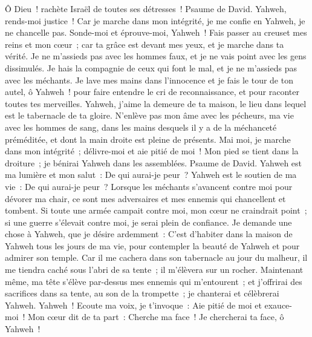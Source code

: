 \begin{multicols}{2}
 Ô Dieu~! rachète Israël de toutes ses détresses~!
\VerseOne{}Psaume de David. Yahweh, rends-moi justice~! Car je marche dans mon intégrité, je me confie en Yahweh, je ne chancelle pas.
Sonde-moi et éprouve-moi, Yahweh~! Fais passer au creuset mes reins et mon cœur~;
car ta grâce est devant mes yeux, et je marche dans ta vérité.
Je ne m'assieds pas avec les hommes faux, et je ne vais point avec les gens dissimulés.
Je hais la compagnie de ceux qui font le mal, et je ne m'assieds pas avec les méchants.
Je lave mes mains dans l'innocence et je fais le tour de ton autel, ô Yahweh~!
pour faire entendre le cri de reconnaissance, et pour raconter toutes tes merveilles.
Yahweh, j'aime la demeure de ta maison, le lieu dans lequel est le tabernacle de ta gloire.
N'enlève pas mon âme avec les pécheurs, ma vie avec les hommes de sang,
dans les mains desquels il y a de la méchanceté préméditée, et dont la main droite est pleine de présents.
Mai moi, je marche dans mon intégrité~; délivre-moi et aie pitié de moi~!
Mon pied se tient dans la droiture~; je bénirai Yahweh dans les assemblées.
\VerseOne{}Psaume de David. Yahweh est ma lumière et mon salut~: De qui aurai-je peur~? Yahweh est le soutien de ma vie~: De qui aurai-je peur~?
Lorsque les méchants s'avancent contre moi pour dévorer ma chair, ce sont mes adversaires et mes ennemis qui chancellent et tombent.
Si toute une armée campait contre moi, mon cœur ne craindrait point~; si une guerre s'élevait contre moi, je serai plein de confiance.
Je demande une chose à Yahweh, que je désire ardemment~: C'est d'habiter dans la maison de Yahweh tous les jours de ma vie, pour contempler la beauté de Yahweh et pour admirer son temple.
Car il me cachera dans son tabernacle au jour du malheur, il me tiendra caché sous l'abri de sa tente~; il m'élèvera sur un rocher.
Maintenant même, ma tête s'élève par-dessus mes ennemis qui m'entourent~; et j'offrirai des sacrifices dans sa tente, au son de la trompette~; je chanterai et célèbrerai Yahweh.
Yahweh~! Ecoute ma voix, je t'invoque~: Aie pitié de moi et exauce-moi~!
Mon cœur dit de ta part~: Cherche ma face~! Je chercherai ta face, ô Yahweh~!

\end{multicols}
